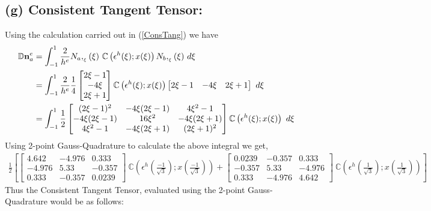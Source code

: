 \documentclass[11pt]{article}
\begin{document}
\subsection*{(g) Consistent Tangent Tensor: }
Using the calculation carried out in (\ref{ConsTang}) we have
\begin{align}
\begin{split}
\mathbb{D}{\bf n}^e_a 
& = 
\int_{-1}^{1} \frac{2}{h^e} N_a,_{_\xi} (\xi)\ \mathbb{C} \left( \epsilon^h(\xi);x(\xi) \right) N_b,_{_\xi} (\xi)\ d\xi  \\
& = \int_{-1}^{1}
\frac{2}{h^e} \frac{1}{4} 
\begin{bmatrix}
2\xi - 1 \\ -4\xi \\ 2\xi + 1 
\end{bmatrix}
\mathbb{C}
\left(
\epsilon^h (\xi) ; x(\xi)
\right)
\begin{bmatrix}
2\xi - 1 & -4\xi & 2\xi + 1 
\end{bmatrix}\ d\xi \\
& = 
\int_{-1}^{1} \frac{1}{2}
\begin{bmatrix}
(2\xi - 1)^2 & -4\xi(2\xi - 1) & 4{\xi}^2 - 1 \\
-4\xi(2\xi - 1) & 16{\xi}^2 & -4\xi(2\xi + 1) \\
4{\xi}^2 - 1 & -4\xi(2\xi + 1) & (2\xi + 1)^2
\end{bmatrix} \mathbb{C}
\left(
\epsilon^h (\xi) ; x(\xi)
\right)\ d\xi
\end{split}  
\end{align}
Using 2-point Gauss-Quadrature to calculate the above integral we get,
\begin{align}
\frac{1}{2}\left[
\begin{bmatrix}
4.642 & -4.976 & 0.333 \\
-4.976 & 5.33 & -0.357 \\
0.333 & -0.357 & 0.0239
\end{bmatrix}\ \mathbb{C}
\left(
\epsilon^h (\frac{-1}{\sqrt{3}}) ; x(\frac{-1}{\sqrt{3}})
\right)+
\begin{bmatrix}
0.0239 & -0.357 & 0.333 \\
-0.357 & 5.33 & -4.976 \\
0.333 & -4.976 & 4.642
\end{bmatrix}\ \mathbb{C}
\left(
\epsilon^h (\frac{1}{\sqrt{3}}) ; x(\frac{1}{\sqrt{3}})
\right)
\right]
\end{align}
Thus the Consistent Tangent Tensor, evaluated using the 2-point Gauss-Quadrature would be as follows: 
\end{document}
